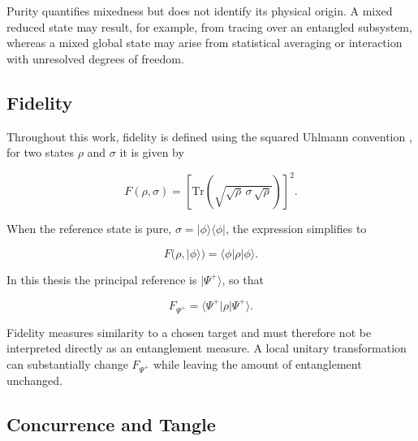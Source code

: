Purity quantifies mixedness but does not identify its physical origin. A mixed
reduced state may result, for example, from tracing over an entangled subsystem,
whereas a mixed global state may arise from statistical averaging or interaction
with unresolved degrees of freedom.


\subsection{Fidelity}
\label{subsec:fidelity}

Throughout this work, fidelity is defined using the squared Uhlmann convention \cite{jozsa_fidelity_1994},
for two states \( \rho \) and \( \sigma \) it is given by

\begin{equation}
F(\rho,\sigma)
=
\left[
\mathrm{Tr}
\left(
\sqrt{
\sqrt{\rho}\,
\sigma\,
\sqrt{\rho}
}
\right)
\right]^2.
\label{eq:fidelity_general_definition}
\end{equation}

When the reference state is pure,
\( \sigma=|\phi\rangle\langle\phi| \), the expression simplifies to

\begin{equation}
F(\rho,|\phi\rangle)
=
\langle\phi|\rho|\phi\rangle.
\label{eq:fidelity_pure_reference}
\end{equation}

In this thesis the principal reference is \( |\Psi^+\rangle \), so that

\begin{equation}
F_{\Psi^+}
=
\langle\Psi^+|\rho|\Psi^+\rangle.
\label{eq:fidelity_psi_plus_definition}
\end{equation}

Fidelity measures similarity to a chosen target and must therefore not be
interpreted directly as an entanglement measure. A local unitary transformation
can substantially change \(F_{\Psi^+}\) while leaving the amount of entanglement
unchanged.


\subsection{Concurrence and Tangle}
\label{subsec:concurrence_tangle}

